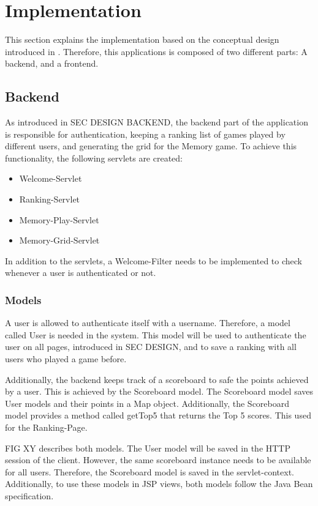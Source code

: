\section{Implementation}\label{sec:03_impl}
This section explains the implementation based on the conceptual design introduced in .
Therefore, this applications is composed of two different parts: A backend, and a frontend.


\subsection{Backend}\label{subsec:03_impl_backend}
%
As introduced in SEC DESIGN BACKEND, the backend part of the application is responsible for authentication, keeping a ranking list of games played by different users, and generating the grid for the Memory game.
To achieve this functionality, the following servlets are created:
\begin{itemize}
\item Welcome-Servlet
\item Ranking-Servlet
\item Memory-Play-Servlet
\item Memory-Grid-Servlet
\end{itemize}
In addition to the servlets, a Welcome-Filter needs to be implemented to check whenever a user is authenticated or not.

\subsubsection{Models}\label{subsubsec:03_impl_backend_models}
A user is allowed to authenticate itself with a username. Therefore, a model called User is needed in the system.
This model will be used to authenticate the user on all pages, introduced in SEC DESIGN, and to save a ranking with all users who played a game before.

Additionally, the backend keeps track of a scoreboard to safe the points achieved by a user. This is achieved by the Scoreboard model.
The Scoreboard model saves User models and their points in a Map object.
Additionally, the Scoreboard model provides a method called getTop5 that returns the Top 5 scores. This used for the Ranking-Page.

FIG XY describes both models. The User model will be saved in the HTTP session of the client. However, the same scoreboard instance needs to be available for all users. Therefore, the Scoreboard model is saved in the servlet-context.
Additionally, to use these models in JSP views, both models follow the Java Bean specification.

